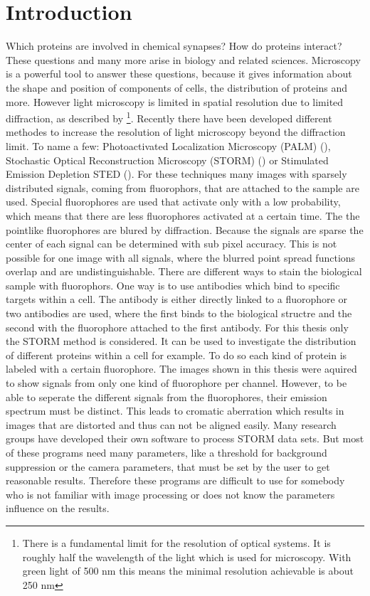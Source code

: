 \chapter{Introduction}
Which proteins are involved in chemical synapses? How do proteins interact? These questions and many more arise in biology and related sciences. Microscopy is a powerful tool to answer these questions, because it gives information about the shape and position of components of cells, the distribution of proteins and more. However light microscopy is limited in spatial resolution due to limited diffraction, as described by \cite{Abbe} \footnote{There is a fundamental limit for the resolution of optical systems. It is roughly half the wavelength of the light which is used for microscopy. With green light of 500 nm this means the minimal resolution achievable is about 250 nm}. Recently there have been developed different methodes to increase the resolution of light microscopy beyond the diffraction limit. To name a few: Photoactivated Localization Microscopy (PALM) (\cite{Palm}), Stochastic Optical Reconstruction Microscopy (STORM) (\cite{Storm}) or Stimulated Emission Depletion STED (\cite{sted}).\newline
For these techniques many images with sparsely distributed signals, coming from fluorophors, that are attached to the sample are used. Special fluorophores are used that activate only with a low probability, which means that there are less fluorophores activated at a certain time. The the pointlike fluorophores are blured by diffraction. Because the signals are sparse the center of each signal can be determined with sub pixel accuracy. This is not possible for one image with all signals, where the blurred point spread functions overlap and are undistinguishable. There are different ways to stain the biological sample with fluorophors. One way is to use antibodies which bind to specific targets within a cell. The antibody is either directly linked to a fluorophore or two antibodies are used, where the first binds to the biological structre and the second with the fluorophore attached to the first antibody. 
\newline
For this thesis only the STORM method is considered. It can be used to investigate the distribution of different proteins within a cell for example. To do so each kind of protein is labeled with a certain fluorophore. The images shown in this thesis were aquired to show signals from only one kind of fluorophore per channel. However, to be able to seperate the different signals from the fluorophores, their emission spectrum must be distinct. This leads to cromatic aberration which results in images that are distorted and thus can not be aligned easily.\newline 
Many research groups have developed their own software to process STORM data sets. But most of these programs need many parameters, like a threshold for background suppression or the camera parameters, that must be set by the user to get reasonable results. Therefore these programs are difficult to use for somebody who is not familiar with image processing or does not know the parameters influence on the results.\newline

